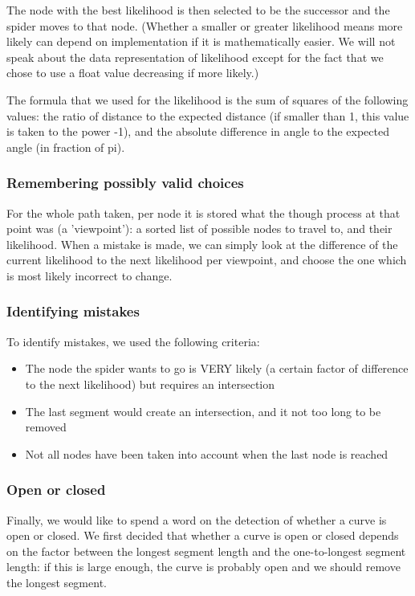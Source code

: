 \documentclass[11pt]{article}
\begin{document}
The node with the best likelihood is then selected to be the successor and the spider moves to that node. (Whether a smaller or greater likelihood means more likely can depend on implementation if it is mathematically easier. We will not speak about the data representation of likelihood except for the fact that we chose to use a float value decreasing if more likely.)

The formula that we used for the likelihood is the sum of squares of the following values: the ratio of distance to the expected distance (if smaller than 1, this value is taken to the power -1), and the absolute difference in angle to the expected angle (in fraction of pi).

\subsubsection{Remembering possibly valid choices} 

For the whole path taken, per node it is stored what the though process at that point was (a 'viewpoint'): a sorted list of possible nodes to travel to, and their likelihood. When a mistake is made, we can simply look at the difference of the current likelihood to the next likelihood per viewpoint, and choose the one which is most likely incorrect to change.

\subsubsection{Identifying mistakes} 

To identify mistakes, we used the following criteria:
\begin{itemize}
\item The node the spider wants to go is VERY likely (a certain factor of difference to the next likelihood) but requires an intersection
\item The last segment would create an intersection, and it not too long to be removed
\item Not all nodes have been taken into account when the last node is reached
\end{itemize}


\subsubsection{Open or closed} 

Finally, we would like to spend a word on the detection of whether a curve is open or closed. We first decided that whether a curve is open or closed depends on the factor between the longest segment length and the one-to-longest segment length: if this is large enough, the curve is probably open and we should remove the longest segment.
\end{document}
